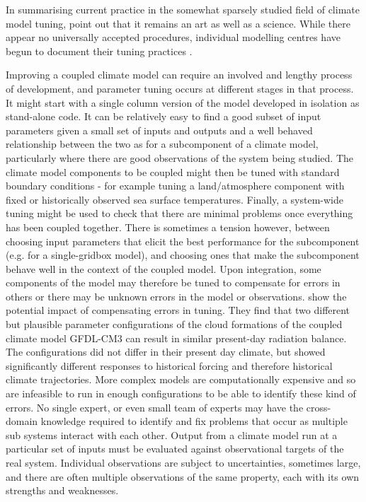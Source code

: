 \documentclass[gmd, manuscript]{copernicus}
\begin{document}
In summarising current practice in the somewhat sparsely studied field of climate model tuning, \cite{hourdin2017art} point out that it remains an art as well as a science. While there appear no universally accepted procedures, individual modelling centres have begun to document their tuning practices \citep{schmidt2017practice, zhao2018gfdl, walters2017um7}. 

Improving a coupled climate model can require an involved and lengthy process of development, and parameter tuning occurs at different stages in that process. It might start with a single column version of the model developed in isolation as stand-alone code. It can be relatively easy to find a good subset of input parameters given a small set of inputs and outputs and a well behaved relationship between the two as for a subcomponent of a climate model, particularly where there are good observations of the system being studied. The climate model components to be coupled might then be tuned with standard boundary conditions - for example tuning a land/atmosphere component with fixed or historically observed sea surface temperatures. Finally, a system-wide tuning might be used to check that there are minimal  problems once everything has been coupled together.  There is sometimes a tension however, between choosing input parameters that elicit the best performance for the subcomponent (e.g. for a single-gridbox model), and choosing ones that make the subcomponent behave well in the context of the coupled model.  Upon integration, some components of the model may therefore be tuned to compensate for errors in others or there may be unknown errors in the model or observations.  \cite{golaz2013cloud} show the potential impact of compensating errors in tuning. They find that two different but plausible parameter configurations of the cloud formations of the coupled climate model GFDL-CM3 can result in similar present-day radiation balance. The configurations did not differ in their present day climate, but showed significantly different responses to historical forcing and therefore historical climate trajectories. More complex models are computationally expensive and so are infeasible to run in enough configurations to be able to identify these kind of errors. No single expert, or even small team of experts may have the cross-domain knowledge required to identify and fix problems that occur as multiple sub systems interact with each other. Output from a climate model run at a particular set of inputs must be evaluated against observational targets of the real system. Individual observations are subject to uncertainties, sometimes large, and there are often multiple observations of the same property, each with its own strengths and weaknesses.
\end{document}
